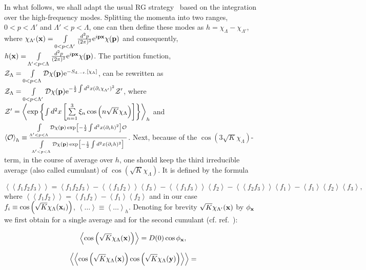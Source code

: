 \documentclass[a4paper,12pt]{article}
\begin{document}
In what follows, we shall adapt the usual RG strategy~\cite{kogut} based on the integration over the
high-frequency modes.
Splitting the momenta into two ranges, $0<p<\Lambda'$ and $\Lambda'<p<\Lambda$, one can then define these
modes as $h=\chi_\Lambda-\chi_{\Lambda'}$, where $\chi_{\Lambda'}({\bf x})=
\int\limits_{0<p<\Lambda'}^{}\frac{d^2p}{(2\pi)^2}{\rm e}^{i{\bf p}{\bf x}}\chi({\bf p})$ and
consequently, $h({\bf x})=\int\limits_{\Lambda'<p<\Lambda}^{}\frac{d^2p}{(2\pi)^2}{\rm e}^{i{\bf p}{\bf x}}\chi({\bf p})$.
The partition function,
${\cal Z}_\Lambda=\int\limits_{0<p<\Lambda}^{}{\cal D}\chi({\bf p})
{\rm e}^{-S_{\rm d.-r.}\left[\chi_\Lambda\right]}$,
can be rewritten as
${\cal Z}_\Lambda=\int\limits_{0<p<\Lambda'}^{}{\cal D}\chi({\bf p})
{\rm e}^{-\frac12\int d^2x\left(\partial_i\chi_{\Lambda'}\right)^2}{\cal Z}'$, where
${\cal Z}'=\left<\exp\left\{
\int d^2x\left[\sum\limits_{n=1}^{3}\xi_n
\cos\left(n\sqrt{K}\chi_\Lambda\right)\right]\right\}\right>_h$
and $\left<{\cal O}\right>_h\equiv\frac{\int\limits_{\Lambda'<p<\Lambda}^{}{\cal D}\chi({\bf p})
\exp\left[-\frac12\int d^2x(\partial_ih)^2\right]{\cal O}}{\int\limits_{\Lambda'<p<\Lambda}^{}{\cal D}\chi({\bf p})
\exp\left[-\frac12\int d^2x(\partial_ih)^2\right]}$. Next, because of the $\cos\left(3\sqrt{K}\chi_\Lambda\right)$-term,
in the course of average over $h$, one should keep the third irreducible average (also called cumulant) of
$\cos\left(\sqrt{K}\chi_\Lambda\right)$. It is defined by the formula

\begin{equation}
\label{fff}
\left<\left<f_1f_2f_3\right>\right>=\left<f_1f_2f_3\right>-\left<\left<f_1f_2\right>\right>\left<f_3\right>-
\left<\left<f_1f_3\right>\right>\left<f_2\right>-\left<\left<f_2f_3\right>\right>\left<f_1\right>-
\left<f_1\right>\left<f_2\right>\left<f_3\right>,
\end{equation}
where $\left<\left<f_1f_2\right>\right>=\left<f_1f_2\right>-\left<f_1\right>\left<f_2\right>$
and in our case $f_i\equiv\cos\left(\sqrt{K}\chi_\Lambda({\bf x}_i)\right)$, $\left<\ldots\right>\equiv\left<\ldots\right>_h$.
Denoting for brevity $\sqrt{K}\chi_{\Lambda'}({\bf x})$ by $\phi_{\bf x}$ we first obtain for a single average and for the second cumulant
(cf. ref.~\cite{kogut}):

\begin{equation}
\label{cos}
\left<\cos\left(\sqrt{K}\chi_\Lambda({\bf x})\right)\right>=D(0)\cos\phi_{\bf x},
\end{equation}

$$
\left<\left<\cos\left(\sqrt{K}\chi_\Lambda({\bf x})\right)\cos\left(\sqrt{K}\chi_\Lambda({\bf y})\right)\right>\right>=
$$
\end{document}
